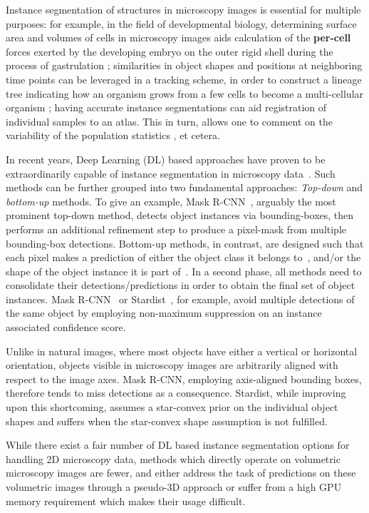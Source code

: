 \documentclass{midl} %
\begin{document}
Instance segmentation of structures in microscopy images is essential for multiple purposes: 
for example, in the field of developmental biology, determining surface area and volumes of cells in microscopy images aids calculation of the \textbf{per-cell} forces  exerted by the developing embryo on the outer rigid shell during the process of gastrulation \cite{munster2019}; 
similarities in  object shapes and positions at neighboring time points can be leveraged in a tracking scheme, in order to construct a lineage tree indicating how an organism grows from a few cells to become a multi-cellular organism \cite{tinevez2016};
having accurate instance segmentations can aid registration of individual samples to an atlas. This in turn, allows one to comment on the variability of the population statistics \cite{}, et cetera.

In recent years, Deep Learning (DL) based approaches have proven to be extraordinarily capable of instance segmentation in microscopy data~\cite{moen2019, caicedo2019_v2}.
Such methods can be further grouped into two fundamental approaches: \textit{Top-down} and \textit{bottom-up} methods. 
To give an example, Mask R-CNN~\cite{he2017}, arguably the most prominent top-down method, detects object instances via bounding-boxes, then performs an additional refinement step to produce a pixel-mask from multiple bounding-box detections.
Bottom-up methods, in contrast, are designed such that each pixel makes a prediction of either the object class it belongs to~\cite{ronneberger2015}, and/or the shape of the object instance it is part of~\cite{schmidt2018,neven2019,hirsch2020}. In a second phase, all methods need to consolidate their detections/predictions in order to obtain the final set of object instances.
Mask R-CNN~\cite{he2017} or Stardist~\cite{schmidt2018}, for example, avoid multiple detections of the same object by employing non-maximum suppression on an instance associated confidence score.

Unlike in natural images, where most objects have either a vertical or horizontal orientation, objects visible in microscopy images are arbitrarily aligned with respect to the image axes. Mask R-CNN, employing axis-aligned bounding boxes, therefore tends to miss detections as a consequence. Stardist, while improving upon this shortcoming, assumes a star-convex prior on the individual object shapes and suffers when the star-convex shape assumption is not fulfilled. 

While there exist a fair number of DL based instance segmentation options for handling 2D microscopy data, methods which directly operate on volumetric microscopy images are fewer, and either address the task of  predictions on these volumetric images through a pseudo-3D approach \cite{stringer2020} or suffer from a high GPU memory requirement which makes their usage difficult.
\end{document}
